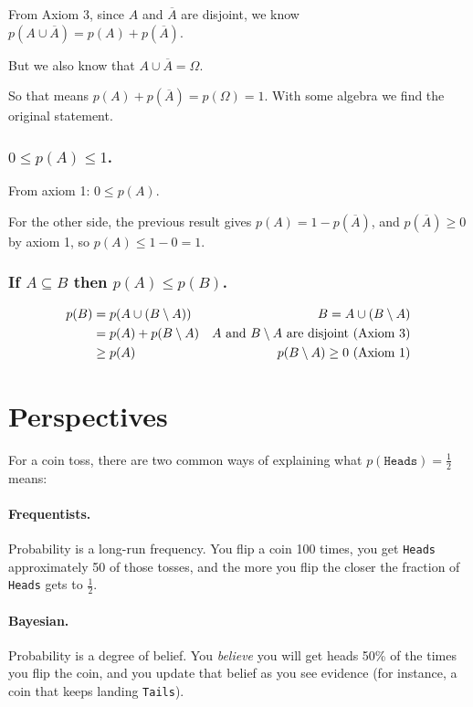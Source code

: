 From Axiom 3, since $A$ and $\overline{A}$ are disjoint, 
we know $p(A\cup\overline{A}) = p(A) + p(\overline{A})$.

But we also know that $A\cup\overline{A} = \Omega$. 

So that means $ p(A) + p(\overline{A}) = p(\Omega) = 1$. 
With some algebra we find the original statement. 

\subsubsection{$0 \le p(A) \le 1$.}

From axiom 1: $0 \le p(A)$.

For the other side, the previous result gives $p(A) = 1-p(\overline{A})$,
and $p(\overline{A})\ge 0$ by axiom 1, so $p(A) \le 1-0 = 1$.

\subsubsection{If $A\subseteq B$ then $p(A) \le p(B)$.}

\begin{align*}
p(B) & = p(A \cup (B\setminus A)) &			B = A \cup (B\setminus A)\\
	&= p(A) + p(B\setminus A) & A \textnormal{ and } B\setminus A \textnormal{ are disjoint (Axiom 3)} \\
	&\ge p(A) 				& p(B\setminus A) \ge 0 \textnormal{ (Axiom 1)} \\
\end{align*}

\section{Perspectives}

For a coin toss, there are two common ways of explaining what $p(\texttt{Heads})=\frac{1}{2}$ means:

\paragraph{Frequentists.}
Probability is a long-run frequency.
You flip a coin 100 times, you get \texttt{Heads} approximately 50 of those tosses,
and the more you flip the closer the fraction of \texttt{Heads} gets to $\frac{1}{2}$.

\paragraph{Bayesian.}
Probability is a degree of belief.
You \textit{believe} you will get heads 50\% of the times you flip the coin,
and you update that belief as you see evidence (for instance, a coin that keeps landing \texttt{Tails}).

